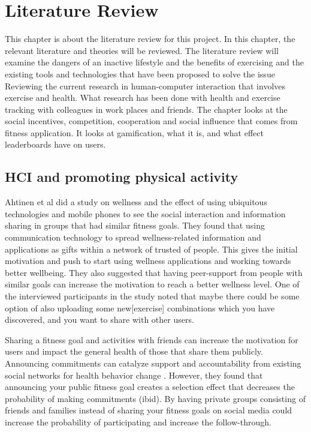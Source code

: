 \chapter{Literature Review}
This chapter is about the literature review for this project. In this chapter, the relevant literature and theories will be reviewed. The literature review will examine the dangers of an inactive lifestyle and the benefits of exercising and the existing tools and technologies that have been proposed to solve the issue Reviewing the current research in human-computer interaction that involves exercise and health. What research has been done with health and exercise tracking with colleagues in work places and friends. The chapter looks at the social incentives, competition, cooperation and social influence that comes from fitness application. It looks at gamification, what it is, and what effect leaderboards have on users.

\section{HCI and promoting physical activity}
Ahtinen et al\cite{Ahtinen2009} did a study on wellness and the effect of using ubiquitous technologies and mobile phones to see the social interaction and information sharing in groups that had similar fitness goals. They found that using communication technology to spread wellness-related information and applications as gifts within a network of trusted of people. This gives the initial motivation and push to start using wellness applications and working towards better wellbeing. They also suggested that having peer-support from people with similar goals can increase the motivation to reach a better wellness level. One of the interviewed participants in the study noted that maybe there could be some option of also uploading some new[exercise] combinations which you have discovered, and you want to share with other users.

Sharing a fitness goal and activities with friends can increase the motivation for users and impact the general health of those that share them publicly. Announcing  commitments can catalyze support and accountability from existing social networks for health behavior change \cite{Munson2015}. However, they found that announcing your public fitness goal creates a selection effect that decreases the probability of making commitments (ibid).  By having private groups consisting of friends and families instead of sharing your fitness goals on social media could increase the probability of participating and increase the follow-through.

